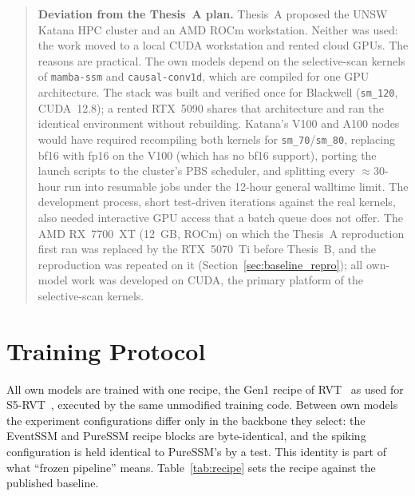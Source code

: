 \documentclass[11pt, a4paper]{report}
\begin{document}
\begin{quote}\small
\textbf{Deviation from the Thesis~A plan.} Thesis~A proposed the UNSW Katana HPC cluster and an AMD
ROCm workstation. Neither was used: the work moved to a local CUDA workstation and rented cloud GPUs.
The reasons are practical. The own models depend on the selective-scan kernels of
\texttt{mamba-ssm} and \texttt{causal-conv1d}, which are compiled for one GPU architecture. The stack
was built and verified once for Blackwell (\texttt{sm\_120}, CUDA~12.8); a rented RTX~5090 shares that
architecture and ran the identical environment without rebuilding. Katana's V100 and A100 nodes would
have required recompiling both kernels for \texttt{sm\_70}/\texttt{sm\_80}, replacing bf16 with fp16
on the V100 (which has no bf16 support), porting the launch scripts to the cluster's PBS scheduler, and
splitting every $\approx$30-hour run into resumable jobs under the 12-hour general walltime limit. The
development process, short test-driven iterations against the real kernels, also needed interactive
GPU access that a batch queue does not offer. The AMD RX~7700~XT (12~GB, ROCm) on which the Thesis~A
reproduction first ran was replaced by the RTX~5070~Ti before Thesis~B, and the reproduction was repeated on
it (Section~\ref{sec:baseline_repro}); all own-model work was developed on
CUDA, the primary platform of the selective-scan kernels.
\end{quote}

\section{Training Protocol}
\label{sec:training}
All own models are trained with one recipe, the Gen1 recipe of RVT~\cite{gehrig2023recurrent} as
used for S5-RVT~\cite{zubic2024state}, executed by the same unmodified training code. Between own models
the experiment configurations differ only in the backbone they select: the EventSSM and PureSSM
recipe blocks are byte-identical, and the spiking configuration is held identical to PureSSM's by a
test. This identity is part of what ``frozen pipeline'' means. Table~\ref{tab:recipe} sets the recipe
against the published baseline.
\end{document}
